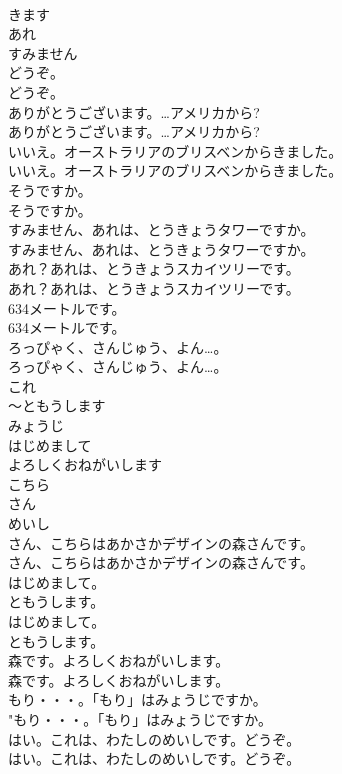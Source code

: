 \documentclass[8pt]{extreport}
\begin{document}
\begin{CJK}{UTF8}{min}
\\	きます
\\	あれ
\\	すみません
\\	どうぞ。	
\\	どうぞ。 
\\	ありがとうございます。…アメリカから?	
\\	ありがとうございます。…アメリカから? 
\\	いいえ。オーストラリアのブリスベンからきました。	
\\	いいえ。オーストラリアのブリスベンからきました。 
\\	そうですか。	
\\	そうですか。 
\\	すみません、あれは、とうきょうタワーですか。	
\\	すみません、あれは、とうきょうタワーですか。 
\\	あれ？あれは、とうきょうスカイツリーです。	
\\	あれ？あれは、とうきょうスカイツリーです。 
\\	634メートルです。	
\\	634メートルです。 
\\	ろっぴゃく、さんじゅう、よん…。	
\\	ろっぴゃく、さんじゅう、よん…。 
\\	これ
\\	～ともうします
\\	みょうじ
\\	はじめまして
\\	よろしくおねがいします
\\	こちら
\\	さん
\\	めいし
\\	さん、こちらはあかさかデザインの森さんです。	
\\	さん、こちらはあかさかデザインの森さんです。 
\\	はじめまして。
\\	ともうします。	
\\	はじめまして。
\\	ともうします。 
\\	森です。よろしくおねがいします。	
\\	森です。よろしくおねがいします。 
\\	もり・・・。「もり」はみょうじですか。	
\\	"もり・・・。「もり」はみょうじですか。 
\\	はい。これは、わたしのめいしです。どうぞ。	
\\	はい。これは、わたしのめいしです。どうぞ。 

\end{CJK}
\end{document}
